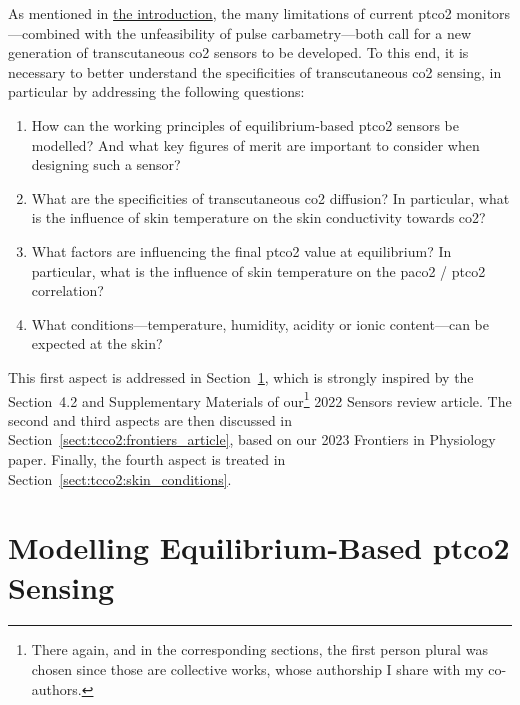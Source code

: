As mentioned in \hyperref[chap:intro]{the introduction}, the many limitations of current \gls{ptco2} monitors---com\-bined with the unfeasibility of pulse carbametry---both call for a new generation of transcutaneous \gls{co2} sensors to be developed. To this end, it is necessary to better understand the specificities of transcutaneous \gls{co2} sensing, in particular by addressing the following questions:
\begin{enumerate}
	\item How can the working principles of equilibrium-based \gls{ptco2} sensors be modelled? And what key figures of merit are important to consider when designing such a sensor?
	\item What are the specificities of transcutaneous \gls{co2} diffusion? In particular, what is the influence of skin temperature on the skin conductivity towards \gls{co2}?
	\item What factors are influencing the final \gls{ptco2} value at equilibrium? In particular, what is the influence of skin temperature on the \gls{paco2} / \gls{ptco2} correlation?
	\item What conditions---temperature, humidity, acidity or ionic content---can be expected at the skin?
\end{enumerate}

This first aspect is addressed in Section~\ref{sect:tcco2:modelling_tc_sensing}, which is strongly inspired by the Section~4.2 and Supplementary Materials of our\footnote{There again, and in the corresponding sections, the first person plural was chosen since those are collective works, whose authorship I share with my co-authors.} 2022 Sensors review article\cite{dervieux2022}. The second and third aspects are then discussed in Section~\ref{sect:tcco2:frontiers_article}, based on our 2023 Frontiers in Physiology paper\cite{dervieux2023rate}. Finally, the fourth aspect is treated in Section~\ref{sect:tcco2:skin_conditions}.

\section{Modelling Equilibrium-Based \texorpdfstring{\gls{ptco2}}{tcpCO2} Sensing}\label{sect:tcco2:modelling_tc_sensing}

